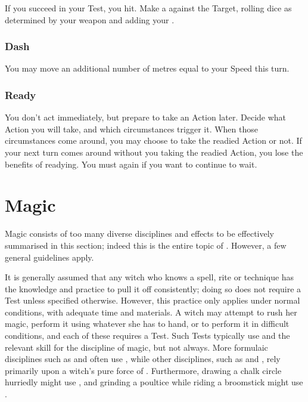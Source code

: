 If you succeed in your Test, you hit.
Make a  against the Target, rolling dice as determined by your weapon and adding your .

\subsubsection{Dash}

You may move an additional number of metres equal to your Speed this turn.

\subsubsection{Ready}

You don't act immediately, but prepare to take an Action later.
Decide what Action you will take, and which circumstances trigger it.
When those circumstances come around, you may choose to take the readied Action or not.
If your next turn comes around without you taking the readied Action, you lose the benefits of readying.
You must  again if you want to continue to wait.

\section{Magic}

Magic consists of too many diverse disciplines and effects to be effectively summarised in this section; indeed this is the entire topic of .
However, a few general guidelines apply.

It is generally assumed that any witch who knows a spell, rite or technique has the knowledge and practice to pull it off consistently; doing so does not require a Test unless specified otherwise.
However, this practice only applies under normal conditions, with adequate time and materials.
A witch may attempt to rush her magic, perform it using whatever she has to hand, or to perform it in difficult conditions, and each of these requires a Test.
Such Tests typically use  and the relevant skill for the discipline of magic, but not always.
More formulaic disciplines such as  and  often use , while other disciplines, such as  and , rely primarily upon a witch's pure force of .
Furthermore, drawing a chalk circle hurriedly might use , and grinding a poultice while riding a broomstick might use .

